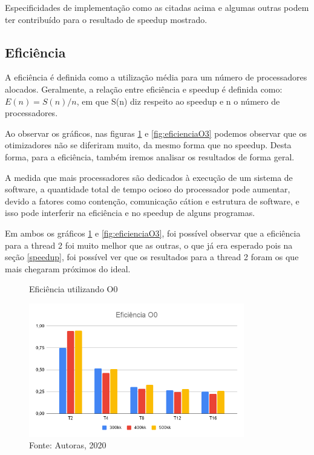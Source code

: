 \documentclass[journal]{IEEEtran}
\begin{document}
 
 Especificidades de implementação como as citadas acima e algumas outras podem ter contribuído para o resultado de speedup mostrado.
 

\subsection{Eficiência}
A eficiência é definida como a utilização média para um número de processadores alocados. Geralmente, a relação entre eficiência e speedup é definida como: $E(n) = S(n)/n$, em que S(n) diz respeito ao speedup e n o número de processadores.

Ao observar os gráficos, nas figuras \ref{fig:eficienciaO0} e \ref{fig:eficienciaO3} podemos observar que os otimizadores não se diferiram muito, da mesmo forma que no speedup. Desta forma, para a eficiência, também iremos analisar os resultados de forma geral. 

A medida que mais processadores são dedicados à execução de um sistema de software, a quantidade total de tempo ocioso do processador pode aumentar, devido a fatores como contenção, comunicação cátion e estrutura de software, e isso pode interferir na eficiência e no speedup de alguns programas.

Em ambos os gráficos \ref{fig:eficienciaO0} e \ref{fig:eficienciaO3}, foi possível observar que a eficiência para a thread 2 foi muito melhor que as outras, o que já era esperado pois na seção \ref{speedup}, foi possível ver que os resultados para a thread 2 foram os que mais chegaram próximos do ideal.



\begin{figure}[H]
    \centering
    \caption{Eficiência utilizando O0}
    \includegraphics[width=3.7in]{imagens/EficienciaO0.png}
    \caption*{Fonte: Autoras, 2020}
    \label{fig:eficienciaO0}
\end{figure}
\end{document}
